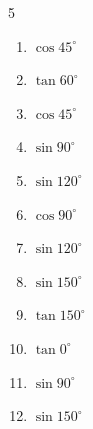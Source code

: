 \begin{multicols}{5}
\begin{enumerate}
        \phantom{$\displaystyle =0$}

  \item $\displaystyle \cos{45^\circ}$


  \item $\displaystyle \tan{60^\circ}$


  \item $\displaystyle \cos{45^\circ}$


\columnbreak %

  \item $\displaystyle \sin{90^\circ}$

        \phantom{$\displaystyle =1$}

  \item $\displaystyle \sin{120^\circ}$


  \item $\displaystyle \cos{90^\circ}$

        \phantom{$\displaystyle =0$}

  \item $\displaystyle \sin{120^\circ}$


  \item $\displaystyle \sin{150^\circ}$


  \item $\displaystyle \tan{150^\circ}$


  \item $\displaystyle \tan{0^\circ}$

        \phantom{$\displaystyle =0$}

  \item $\displaystyle \sin{90^\circ}$

        \phantom{$\displaystyle =1$}

  \item $\displaystyle \sin{150^\circ}$



\end{enumerate}
\end{multicols}
